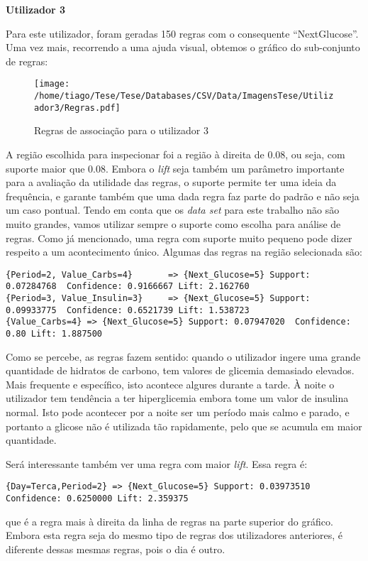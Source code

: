 \textbf{Utilizador 3}

Para este utilizador, foram geradas 150 regras com o consequente ``Next\textunderscore Glucose''. Uma vez mais, recorrendo a uma ajuda visual, obtemos o gráfico do sub-conjunto de regras:


\begin{figure}[H]
\centering
\texttt{[image: /home/tiago/Tese/Tese/Databases/CSV/Data/ImagensTese/Utilizador3/Regras.pdf]}
\caption{Regras de associação para o utilizador 3}
\end{figure}
A região escolhida para inspecionar foi a região à direita de 0.08, ou seja, com suporte maior que 0.08. Embora o \textit{lift} seja também um parâmetro importante para a avaliação da utilidade das regras, o suporte permite ter uma ideia da frequência, e garante também que uma dada regra faz parte do padrão e não seja um caso pontual. Tendo em conta que os \textit{data set} para este trabalho não são muito grandes, vamos utilizar sempre o suporte como escolha para análise de regras. Como já mencionado, uma regra com suporte muito pequeno pode dizer respeito a um acontecimento único. Algumas das regras na região selecionada são:

\begin{lstlisting}
{Period=2, Value_Carbs=4}       => {Next_Glucose=5} Support: 0.07284768  Confidence: 0.9166667 Lift: 2.162760
{Period=3, Value_Insulin=3}     => {Next_Glucose=5} Support: 0.09933775  Confidence: 0.6521739 Lift: 1.538723
{Value_Carbs=4} => {Next_Glucose=5} Support: 0.07947020  Confidence: 0.80 Lift: 1.887500
\end{lstlisting}
Como se percebe, as regras fazem sentido: quando o utilizador ingere uma grande quantidade de hidratos de carbono, tem valores de glicemia demasiado elevados. Mais frequente e específico, isto acontece algures durante a tarde. À noite o utilizador tem tendência a ter hiperglicemia embora tome um valor de insulina normal. Isto pode acontecer por a noite ser um período mais calmo e parado, e portanto a glicose não é utilizada tão rapidamente, pelo que se acumula em maior quantidade. 

Será interessante também ver uma regra com maior \textit{lift}. Essa regra é:

\begin{lstlisting}
{Day=Terca,Period=2} => {Next_Glucose=5} Support: 0.03973510  Confidence: 0.6250000 Lift: 2.359375
\end{lstlisting}
que é a regra mais à direita da linha de regras na parte superior do gráfico. Embora esta regra seja do mesmo tipo de regras dos utilizadores anteriores, é diferente dessas mesmas regras, pois o dia é outro. 

